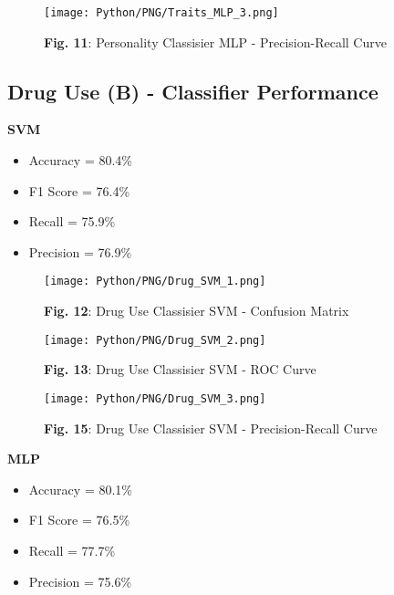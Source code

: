 \documentclass{article}
\begin{document}
\vspace{1.5cm}

\begin{figure}[!h]
    \centering
    \texttt{[image: Python/PNG/Traits\_MLP\_3.png]}
    \caption{\textbf{Fig. 11}: Personality Classisier MLP - Precision-Recall Curve}
\end{figure}


\newpage
\subsection{Drug Use (B) - Classifier Performance}

\textbf{SVM}
\begin{itemize}
    \item Accuracy = 80.4\%
    \item F1 Score = 76.4\%
    \item Recall = 75.9\%
    \item Precision = 76.9\%
\end{itemize}

\begin{figure}[!h]
    \centering
    \texttt{[image: Python/PNG/Drug\_SVM\_1.png]}
    \caption{\textbf{Fig. 12}: Drug Use Classisier SVM - Confusion Matrix}
\end{figure}
\vspace{1cm}
\begin{figure}[!h]
    \centering
    \texttt{[image: Python/PNG/Drug\_SVM\_2.png]}
    \caption{\textbf{Fig. 13}: Drug Use Classisier SVM - ROC Curve}
\end{figure}

\newpage

\begin{figure}[!h]
    \centering
    \texttt{[image: Python/PNG/Drug\_SVM\_3.png]}
    \caption{\textbf{Fig. 15}: Drug Use Classisier SVM - Precision-Recall Curve}
\end{figure}


\vspace{1cm}


\textbf{MLP}
\begin{itemize}
    \item Accuracy = 80.1\%
    \item F1 Score = 76.5\%
    \item Recall = 77.7\%
    \item Precision = 75.6\%
\end{itemize}
\end{document}
